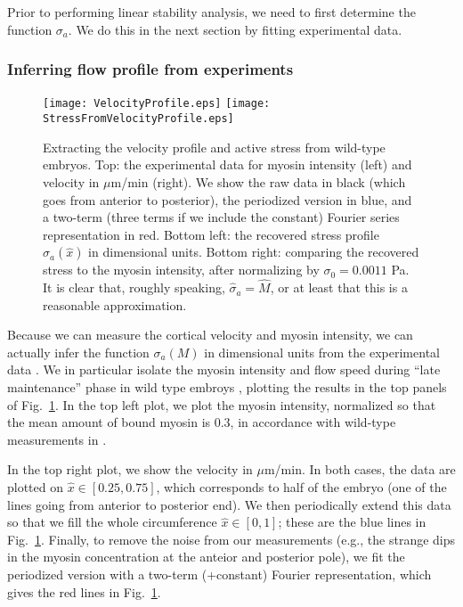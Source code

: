 \documentclass[11pt]{article}
\newcommand{\6}[1]{#1_{\text{6}}}
\newcommand{\3}[1]{#1_{\text{3}}}
\begin{document}
Prior to performing linear stability analysis, we need to first determine the function $\sigma_a$. We do this in the next section by fitting experimental data.

\subsubsection{Inferring flow profile from experiments \label{sec:MyVelFit}}
\begin{figure}
\centering
\texttt{[image: VelocityProfile.eps]}
\texttt{[image: StressFromVelocityProfile.eps]}
\caption{\label{fig:VelProf} Extracting the velocity profile and active stress from wild-type embryos. Top: the experimental data for myosin intensity (left) and velocity in $\mu$m/min (right). We show the raw data in black (which goes from anterior to posterior), the periodized version in blue, and a two-term (three terms if we include the constant) Fourier series representation in red. Bottom left: the recovered stress profile $\sigma_a(\hat x)$ in dimensional units. Bottom right: comparing the recovered stress to the myosin intensity, after normalizing by $\sigma_0=0.0011$ Pa. It is clear that, roughly speaking, $\hat \sigma_a = \hat M$, or at least that this is a reasonable approximation.}
\end{figure}


Because we can measure the cortical velocity and myosin intensity, we can actually infer the function $\sigma_a(M)$ in dimensional units from the experimental data \cite{sailer2015dynamic}. We in particular isolate the myosin intensity and flow speed during ``late maintenance'' phase in wild type embroys \cite[Fig.~1B(bottom)]{sailer2015dynamic}, plotting the results in the top panels of Fig.\ \ref{fig:VelProf}. In the top left plot, we plot the myosin intensity, normalized so that the mean amount of bound myosin is 0.3, in accordance with wild-type measurements in \cite[Fig.~S3]{gross2019guiding}. 

In the top right plot, we show the velocity in $\mu$m/min. In both cases, the data are plotted on $\hat x \in [0.25,0.75]$, which corresponds to half of the embryo (one of the lines going from anterior to posterior end). We then periodically extend this data so that we fill the whole circumference $\hat x \in [0,1]$; these are the blue lines in Fig.\ \ref{fig:VelProf}. Finally, to remove the noise from our measurements (e.g., the strange dips in the myosin concentration at the anteior and posterior pole), we fit the periodized version with a two-term (+constant) Fourier representation, which gives the red lines in Fig.\ \ref{fig:VelProf}. 
\end{document}
